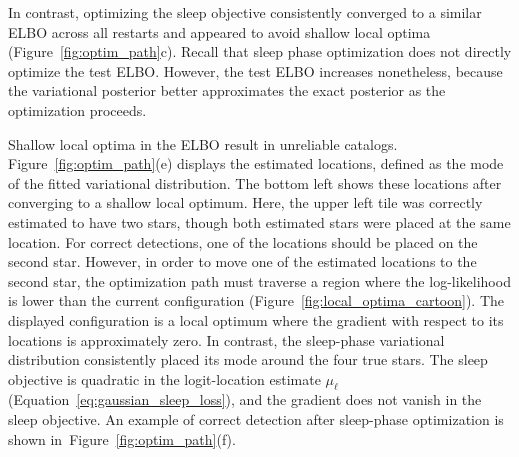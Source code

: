 In contrast, optimizing the sleep objective consistently converged to a similar ELBO across all restarts and appeared to avoid shallow local optima (Figure~\ref{fig:optim_path}c).
Recall that sleep phase optimization does not directly optimize the test ELBO. However, the test ELBO increases nonetheless, because the variational posterior better approximates the exact posterior as the optimization proceeds. 

Shallow local optima in the ELBO result in unreliable catalogs. 
Figure~\ref{fig:optim_path}(e) displays the estimated locations, defined as the mode of the fitted variational distribution. 
The bottom left shows these locations after converging to a shallow local optimum. 
Here, the upper left tile was correctly estimated to have two stars, though both estimated stars were placed at the same location.
For correct detections, one of the locations should be placed on the second star.
However, in order to move one of the estimated locations to the second star, the optimization path must traverse a region where the log-likelihood is lower than the current configuration (Figure~\ref{fig:local_optima_cartoon}). 
The displayed configuration is a local optimum where the gradient with respect to its locations is approximately zero.
In contrast, the sleep-phase variational distribution consistently placed its mode around the four true stars. 
The sleep objective is quadratic in the logit-location estimate $\mu_\ell$ (Equation~\ref{eq:gaussian_sleep_loss}), and the gradient does not vanish in the sleep objective. 
An example of correct detection after sleep-phase optimization is shown in~Figure~\ref{fig:optim_path}(f).

